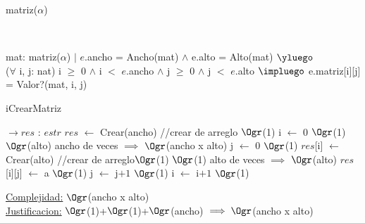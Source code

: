 \begin{Representacion}
	
	
	\begin{Estructura}{matriz($\alpha$)}
		 \begin{Tupla}[estr]
		\end{Tupla}
	\end{Estructura}
	
	
	~	
	
	{mat: matriz($\alpha$) $|$ $e$.ancho = Ancho(mat) $\land$ e.alto = Alto(mat) $\yluego$\\
	($\forall$ i, j: nat) i $\geq$ $0$ $\land$ i $<$ $e$.ancho $\land$ j $\geq$ $0$ $\land$ j $<$ $e$.alto $\impluego$ e.matriz[i][j] = Valor?(mat, i, j) }
	
\begin{Algoritmos}
	
	\begin{algorithm}[H]
		\caption{iCrearMatriz}
		
		\begin{algorithmic}[1]
			 $\to res$ : $estr$
			\State $res$ $\leftarrow$ Crear(ancho) //crear de arreglo \Comment $\Ogr$(1)
			\State i $\leftarrow$ $0$ \Comment $\Ogr$(1)
			 \Comment $\Ogr$(alto) ancho de veces $\implies$ $\Ogr$(ancho x alto)
				\State j $\leftarrow$ $0$ \Comment $\Ogr$(1)
				\State $res$[i] $\leftarrow$ Crear(alto) //crear de arreglo\Comment $\Ogr$(1)
				 \Comment $\Ogr$(1) alto de veces $\implies$  $\Ogr$(alto)
					\State $res$[i][j] $\leftarrow$ a \Comment $\Ogr$(1)
					\State j $\leftarrow$ j$+1$ \Comment $\Ogr$(1)
				\EndWhile
				\State i $\leftarrow$ i$+1$ \Comment $\Ogr$(1)
			\EndWhile
			\EndProcedure
		\end{algorithmic}
		\underline{Complejidad:} $\Ogr$(ancho x alto)
		\\
		\underline{Justificacion:} $\Ogr$(1)+$\Ogr$(1)+$\Ogr$(ancho) $\implies \Ogr$(ancho x alto)
		

\end{algorithm}
\end{Algoritmos}
\end{Representacion}
